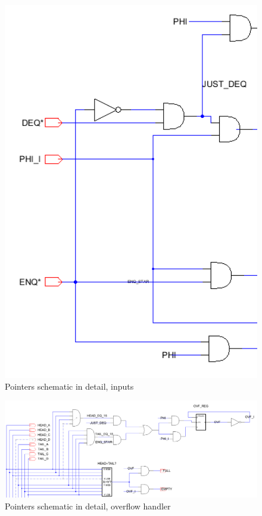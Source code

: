 \documentclass[12pt]{report}
\begin{document}
\begin{figure}[H]
  \centering
    \includegraphics[width=1.0\textwidth]{Schematics/pointers_inputs_schematic.PNG}
  \caption{Pointers schematic in detail, inputs}
  \label{fig:pointers_inputs_schematic}
\end{figure}
\begin{figure}[H]
  \centering
    \includegraphics[width=1.0\textwidth]{Schematics/pointers_overflow_schematic.PNG}
  \caption{Pointers schematic in detail, overflow handler}
  \label{fig:pointers_overflow_schematic}
\end{figure}
\end{document}
